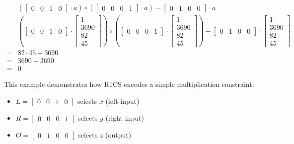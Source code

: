 \documentclass{article}
\begin{document}
\begin{align*}
&(\begin{bmatrix} 0 & 0 & 1 & 0 \end{bmatrix} \cdot a) \circ (\begin{bmatrix} 0 & 0 & 0 & 1 \end{bmatrix} \cdot a) - \begin{bmatrix} 0 & 1 & 0 & 0 \end{bmatrix} \cdot a \\
=&(\begin{bmatrix} 0 & 0 & 1 & 0 \end{bmatrix} \cdot \begin{bmatrix}
1 \\ 3690 \\ 82 \\ 45
\end{bmatrix}) \circ (\begin{bmatrix} 0 & 0 & 0 & 1 \end{bmatrix} \cdot \begin{bmatrix}
1 \\ 3690 \\ 82 \\ 45
\end{bmatrix}) - \begin{bmatrix} 0 & 1 & 0 & 0 \end{bmatrix} \cdot \begin{bmatrix}
1 \\ 3690 \\ 82 \\ 45
\end{bmatrix} \\
=& 82 \cdot 45 - 3690 \\
=& 3690 - 3690 \\
=& 0
\end{align*}

This example demonstrates how R1CS encodes a simple multiplication constraint:
\begin{itemize}
\item $L = \begin{bmatrix} 0 & 0 & 1 & 0 \end{bmatrix}$ selects $x$ (left input)
\item $R = \begin{bmatrix} 0 & 0 & 0 & 1 \end{bmatrix}$ selects $y$ (right input)
\item $O = \begin{bmatrix} 0 & 1 & 0 & 0 \end{bmatrix}$ selects $z$ (output)
\end{itemize}
\end{document}
